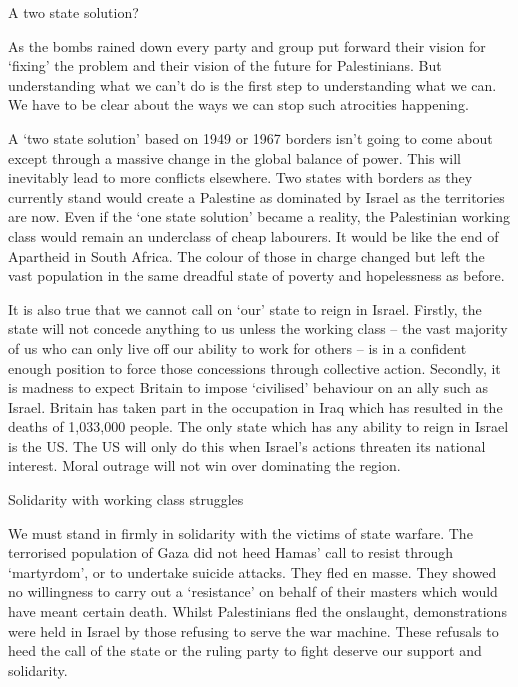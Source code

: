 A two state solution?

As the bombs rained down every party and group put forward their vision for ‘fixing’
the problem and their vision of the future for Palestinians. But understanding what we
can’t do is the first step to understanding what we can. We have to be clear about the
ways we can stop such atrocities happening.

A ‘two state solution’ based on 1949 or 1967 borders isn’t going to come about except
through a massive change in the global balance of power. This will inevitably lead to
more conflicts elsewhere. Two states with borders as they currently stand would create a
Palestine as dominated by Israel as the territories are now. Even if the ‘one state solution’
became a reality, the Palestinian working class would remain an underclass of cheap
labourers. It would be like the end of Apartheid in South Africa. The colour of those in
charge changed but left the vast population in the same dreadful state of poverty and
hopelessness as before.

It is also true that we cannot call on ‘our’ state to reign in Israel. Firstly, the state will
not concede anything to us unless the working class – the vast majority of us who can
only live off our ability to work for others – is in a confident enough position to force
those concessions through collective action. Secondly, it is madness to expect Britain to
impose ‘civilised’ behaviour on an ally such as Israel. Britain has taken part in the occupation in Iraq which has resulted in the deaths of 1,033,000 people. The only state which
has any ability to reign in Israel is the US. The US will only do this when Israel’s actions
threaten its national interest. Moral outrage will not win over dominating the region.

Solidarity with working class struggles

We must stand in firmly in solidarity with the victims of state warfare. The terrorised
population of Gaza did not heed Hamas’ call to resist through ‘martyrdom’, or to
undertake suicide attacks. They fled en masse. They showed no willingness to carry out
a ‘resistance’ on behalf of their masters which would have meant certain death. Whilst
Palestinians fled the onslaught, demonstrations were held in Israel by those refusing to
serve the war machine. These refusals to heed the call of the state or the ruling party to
fight deserve our support and solidarity.

